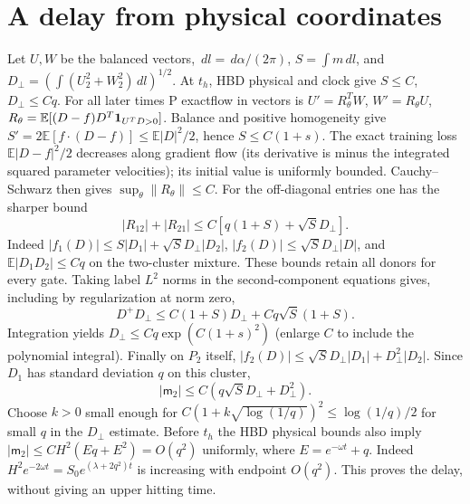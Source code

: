 \documentclass[11pt]{article}
\newcommand{\dd}{\,d}\newcommand{\E}{\mathbb E}
\begin{document}
\section{A delay from physical coordinates}
Let $U,W$ be the balanced vectors, $\dd l=\dd\alpha/(2\pi)$,
$S=\int m\dd l$, and
$D_\perp=(\int(U_2^2+W_2^2)\dd l)^{1/2}$.
At $t_h$, HBD physical and clock give $S\le C$, $D_\perp\le Cq$.
For all later times P exactflow in vectors is
$U'=R_\theta^TW$, $W'=R_\theta U$,
$R_\theta=\E[(D-f)D^T{\bf1}_{U^TD>0}]$.
Balance and positive homogeneity give
$S'=2\E[f\cdot(D-f)]\le \E|D|^2/2$, hence $S\le C(1+s)$.
The exact training loss $\E|D-f|^2/2$ decreases along gradient
flow (its derivative is minus the integrated squared parameter
velocities); its initial value is uniformly bounded.
Cauchy--Schwarz then gives $\sup_\theta\|R_\theta\|\le C$.
For the off-diagonal entries one has the sharper bound
\[
 |R_{12}|+|R_{21}|\le C[q(1+S)+\sqrt S D_\perp].
\]
Indeed $|f_1(D)|\le S|D_1|+\sqrt S D_\perp|D_2|$,
$|f_2(D)|\le \sqrt S D_\perp|D|$, and $\E|D_1D_2|\le Cq$
on the two-cluster mixture. These bounds retain all donors for
every gate. Taking label $L^2$ norms in the second-component
equations gives, including by regularization at norm zero,
\[
 D^+D_\perp\le C(1+S)D_\perp+Cq\sqrt S(1+S).
\]
Integration yields $D_\perp\le C q\exp(C(1+s)^2)$ (enlarge $C$
to include the polynomial integral). Finally on $P_2$ itself,
$|f_2(D)|\le \sqrt S D_\perp |D_1|+D_\perp^2 |D_2|$.
Since $D_1$ has standard deviation $q$ on this cluster,
\begin{equation}\label{an04brwv1:delay}
 |\mathsf m_2|\le C(q\sqrt S D_\perp+D_\perp^2).
\end{equation}
Choose $k>0$ small enough for $C(1+k\sqrt{\log(1/q)})^2
\le \log(1/q)/2$ for small $q$ in the $D_\perp$ estimate.
Before $t_h$ the HBD physical bounds also imply
$|\mathsf m_2|\le C H^2(Eq+E^2)=O(q^2)$ uniformly, where
$E=e^{-\omega t}+q$. Indeed $H^2 e^{-2\omega t}
=S_0e^{(\lambda+2q^2)t}$ is increasing with endpoint $O(q^2)$.
This proves the delay, without giving an upper hitting time.
\end{document}

